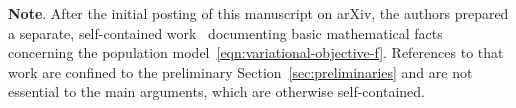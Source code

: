 \documentclass[sn-mathphys-num]{sn-jnl}%
\numberwithin{equation}{section}
\theoremstyle{thmstyleone}%
\theoremstyle{thmstyletwo}%
\theoremstyle{thmstylethree}%
\begin{document}







\textbf{Note}. After the initial posting of this manuscript on arXiv, the authors prepared a separate, self-contained work~\cite{LiRu25} documenting basic mathematical facts concerning the population model~\eqref{eqn:variational-objective-f}. References to that work are confined to the preliminary Section~\ref{sec:preliminaries} and are not essential to the main arguments, which are otherwise self-contained.



\end{document}
